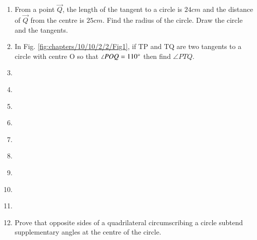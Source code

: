 \begin{enumerate}[label=\thesection.\arabic*,ref=\thesection.\theenumi]
\item From a point $\vec{Q}$, the length of the tangent to a circle is $24 cm$ and the distance of $\vec{Q}$ from the centre is $25 cm$. Find the radius of the circle. Draw the circle and the tangents. 
\label{chapters/10/10/2/1}
\\
\solution

\item In Fig. \ref{fig:chapters/10/10/2/2/Fig1}, if TP and TQ are two tangents to a circle with centre O so that $\angle{POQ} = 110\degree$ then find $\angle{PTQ}$. 
\\
\solution

\item 
\label{chapters/10/10/2/4}

\item 
\label{chapters/10/10/2/5}
%
\item 
\label{chapters/10/10/2/6}

\item 
\label{chapters/10/10/2/7}

\item 
\label{chapters/10/10/2/8}

\item 
\label{chapters/10/10/2/9}

\item 
\label{chapters/10/10/2/10}

\item 
%
\item 
\label{chapters/10/10/2/12}

 \item Prove that opposite sides of a quadrilateral circumscribing a circle 
    subtend supplementary angles at the centre of the circle.
\label{chapters/10/10/2/13}
\\
       \solution 


\end{enumerate}
